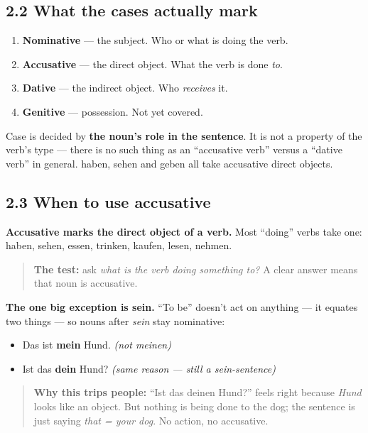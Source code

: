 \documentclass[
  11pt,
]{article}
\providecommand{\tightlist}{%
  \setlength{\itemsep}{0pt}\setlength{\parskip}{0pt}}
\begin{document}
\subsection{2.2 What the cases actually
mark}\label{what-the-cases-actually-mark}

\begin{enumerate}
\def\labelenumi{\arabic{enumi}.}
\tightlist
\item
  \textbf{Nominative} --- the subject. Who or what is doing the verb.
\item
  \textbf{Accusative} --- the direct object. What the verb is done
  \emph{to}.
\item
  \textbf{Dative} --- the indirect object. Who \emph{receives} it.
\item
  \textbf{Genitive} --- possession. Not yet covered.
\end{enumerate}

Case is decided by \textbf{the noun's role in the sentence}. It is not a
property of the verb's type --- there is no such thing as an
``accusative verb'' versus a ``dative verb'' in general. haben, sehen
and geben all take accusative direct objects.

\subsection{2.3 When to use accusative}\label{when-to-use-accusative}

\textbf{Accusative marks the direct object of a verb.} Most ``doing''
verbs take one: haben, sehen, essen, trinken, kaufen, lesen, nehmen.

\begin{quote}
\textbf{The test:} ask \emph{what is the verb doing something to?} A
clear answer means that noun is accusative.
\end{quote}

\textbf{The one big exception is sein.} ``To be'' doesn't act on
anything --- it equates two things --- so nouns after \emph{sein} stay
nominative:

\begin{itemize}
\tightlist
\item
  Das ist \textbf{mein} Hund. \emph{(not meinen)}
\item
  Ist das \textbf{dein} Hund? \emph{(same reason --- still a
  sein-sentence)}
\end{itemize}

\begin{quote}
\textbf{Why this trips people:} ``Ist das deinen Hund?'' feels right
because \emph{Hund} looks like an object. But nothing is being done to
the dog; the sentence is just saying \emph{that = your dog}. No action,
no accusative.
\end{quote}
\end{document}
